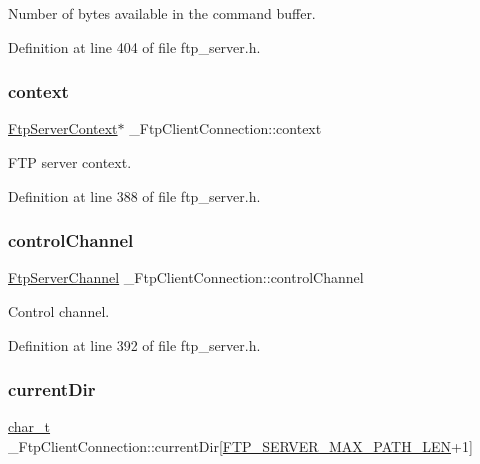Number of bytes available in the command buffer. 



Definition at line 404 of file ftp\+\_\+server.\+h.

\mbox{\label{struct__FtpClientConnection_a42fb1fa2b8ee5ffae185419e75e0e0f1}} 
\subsubsection{\texorpdfstring{context}{context}}
{\footnotesize\ttfamily \hyperlink{ftp__server_8h_af7294ff4e42ca4befb7414ce9fd6f287}{Ftp\+Server\+Context}$\ast$ \+\_\+\+Ftp\+Client\+Connection\+::context}



F\+TP server context. 



Definition at line 388 of file ftp\+\_\+server.\+h.

\mbox{\label{struct__FtpClientConnection_a29ae5684371cbb12a4ed5a179cf9ab92}} 
\subsubsection{\texorpdfstring{control\+Channel}{controlChannel}}
{\footnotesize\ttfamily \hyperlink{structFtpServerChannel}{Ftp\+Server\+Channel} \+\_\+\+Ftp\+Client\+Connection\+::control\+Channel}



Control channel. 



Definition at line 392 of file ftp\+\_\+server.\+h.

\mbox{\label{struct__FtpClientConnection_a82f458263d012950c964b88d899637c6}} 
\subsubsection{\texorpdfstring{current\+Dir}{currentDir}}
{\footnotesize\ttfamily \hyperlink{compiler__port_8h_a40bb5262bf908c328fbcfbe5d29d0201}{char\+\_\+t} \+\_\+\+Ftp\+Client\+Connection\+::current\+Dir\mbox{[}\hyperlink{ftp__server_8h_ade570d175c68d8272bc482bf337af10f}{F\+T\+P\+\_\+\+S\+E\+R\+V\+E\+R\+\_\+\+M\+A\+X\+\_\+\+P\+A\+T\+H\+\_\+\+L\+EN}+1\mbox{]}}



